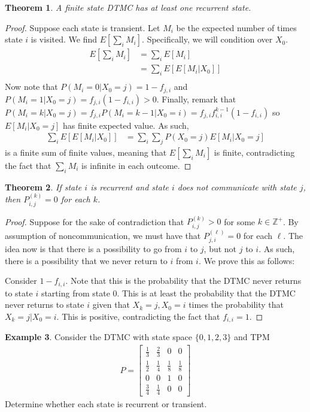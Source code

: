 \documentclass[11pt]{amsart}
\newtheorem{theorem}{Theorem}[section]
\theoremstyle{definition}
\newtheorem{example}[theorem]{Example}
\numberwithin{equation}{section}
\begin{document}
 \begin{theorem}\label{hammerexists}
     A finite state DTMC has at least one recurrent state.
 \end{theorem}
 \begin{proof}
     Suppose each state is transient. Let $M_i$ be the expected number of times state $i$ is visited. We find $E[\sum_iM_i]$. Specifically, we will condition over $X_0$.
     \begin{align*}
         E[\sum_iM_i]&=\sum_iE[M_i]\\
         &=\sum_iE[E[M_i|X_0]]\\
     \end{align*}
     Now note that $P(M_i=0|X_0=j)=1-f_{j,i}$ and $P(M_i=1|X_0=j)=f_{j,i}(1-f_{i,i})>0$. Finally, remark that $P(M_i=k|X_0=j)=f_{j,i}P(M_i=k-1|X_0=i)=f_{j,i}f_{i,i}^{k-1}(1-f_{i,i})$ so $E[M_i|X_0=j]$ has finite expected value. As such, 
     \begin{align*}
         \sum_iE[E[M_i|X_0]]&=\sum_i\sum_jP(X_0=j)E[M_i|X_0=j]
     \end{align*}
     is a finite sum of finite values, meaning that $E[\sum_iM_i]$ is finite, contradicting the fact that $\sum_iM_i$ is infinite in each outcome.
 \end{proof}
 \begin{theorem}
     If state $i$ is recurrent and state $i$ does not communicate with state $j$, then $P_{i,j}^{(k)}=0$ for each $k$.
 \end{theorem}
 \begin{proof}
     Suppose for the sake of contradiction that $P_{i,j}^{(k)}>0$ for some $k\in\mathbb Z^+$. By assumption of noncommunication, we must have that $P_{j,i}^{(\ell)}=0$ for each $\ell$. The idea now is that there is a possibility to go from $i$ to $j$, but not $j$ to $i$. As such, there is a possibility that we never return to $i$ from $i$. We prove this as follows:

     Consider $1-f_{i,i}$. Note that this is the probability that the DTMC never returns to state $i$ starting from state $0$. This is at least the probability that the DTMC never returns to state $i$ given that $X_{k}=j,X_0=i$ times the probability that $X_k=j|X_0=i$. This is positive, contradicting the fact that $f_{i,i}=1$.
 \end{proof}
 \begin{example}
     Consider the DTMC with state space $\{0,1,2,3\}$ and TPM 
     \begin{align*}
         P=\begin{bmatrix}
             \frac{1}{3} & \frac{2}{3} & 0 & 0\\
             \frac{1}{2} & \frac{1}{4} & \frac{1}{8} & \frac{1}{8}\\
             0 & 0 & 1 & 0\\
             \frac{3}{4} & \frac{1}{4} & 0 & 0
         \end{bmatrix}
     \end{align*}
     Determine whether each state is recurrent or transient.
 \end{example}
\end{document}
